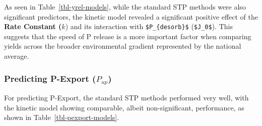 \documentclass[
  a4paper,
]{article}
\begin{document}
As seen in Table~\ref{tbl-yrel-models}, while the standard STP methods
were also significant predictors, the kinetic model revealed a
significant positive effect of the \textbf{Rate Constant (}\(k\)) and
its interaction with \texttt{\$P\_\{desorb\}\$} (\texttt{\$J\_0\$}).
This suggests that the speed of P release is a more important factor
when comparing yields across the broader environmental gradient
represented by the national average.

\subsubsection{\texorpdfstring{Predicting P-Export
(\(P_{up}\))}{Predicting P-Export (P\_\{up\})}}\label{sec-pexport}

For predicting P-Export, the standard STP methods performed very well,
with the kinetic model showing comparable, albeit non-significant,
performance, as shown in Table~\ref{tbl-pexport-models}.
\end{document}
